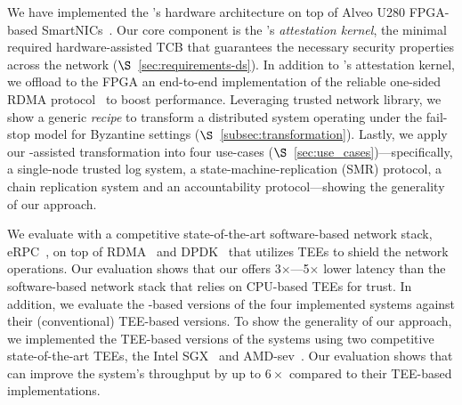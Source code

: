 We have implemented the \projecttitle{}'s hardware architecture on top of Alveo U280 FPGA-based SmartNICs~\cite{u280_smartnics}. Our core component is the \projecttitle{}'s {\em attestation kernel}, the minimal required hardware-assisted TCB that guarantees the necessary security properties across the network ($\S$~\ref{sec:requirements-ds}). In addition to \projecttitle{}'s attestation kernel, we offload to the FPGA an end-to-end implementation of the reliable one-sided RDMA protocol~\cite{rdma_specification} to boost performance. Leveraging \projecttitle{} trusted network library, we show a generic {\em recipe} to transform a distributed system operating under the fail-stop model for Byzantine settings ($\S$~\ref{subsec:transformation}). Lastly, we apply our \projecttitle{}-assisted transformation into four use-cases ($\S$~\ref{sec:use_cases})---specifically, a single-node trusted log system, a state-machine-replication (SMR) protocol, a chain replication system and an accountability protocol---showing the generality of our approach. 


We evaluate \projecttitle{} with a competitive state-of-the-art software-based network stack, eRPC~\cite{erpc}, on top of RDMA~\cite{rdma} and DPDK~\cite{dpdk} that utilizes TEEs to shield the network operations. Our evaluation shows that our \projecttitle{} offers 3$\times$---5$\times$ lower latency than the software-based network stack that relies on CPU-based TEEs for trust. In addition, we evaluate the \projecttitle{}-based versions of the four implemented systems against their (conventional) TEE-based versions. To show the generality of our approach, we implemented the TEE-based versions of the systems using two competitive state-of-the-art TEEs, the Intel SGX~\cite{intel-sgx} and AMD-sev~\cite{amd-sev}. Our evaluation shows that \projecttitle{} can improve the system's throughput by up to $6\times$ compared to their TEE-based implementations.

